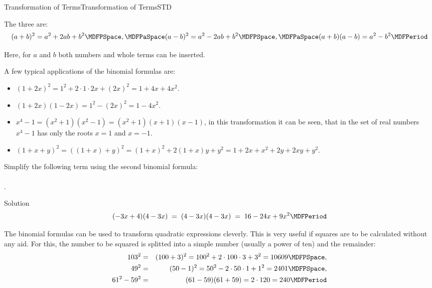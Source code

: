 \begin{MXContent}{Transformation of Terms}{Transformation of Terms}{STD}
\begin{MInfo}
The three  are:
$$ (a+b)^2 = a^2+2a b+b^2 \MDFPSpace, \MDFPaSpace (a-b)^2 = a^2-2a b+b^2 \MDFPSpace,\MDFPaSpace (a+b)(a-b) = a^2-b^2 \MDFPeriod $$
\end{MInfo}


Here, for $a$ and $b$ both numbers and whole terms can be inserted.

\begin{MExample}
A few typical applications of the binomial formulas are:
\begin{itemize}
\item{$(1+2x)^2=1^2+2\cdot1\cdot 2x+(2x)^2=1+4x+4x^2$.}
\item{$(1+2x)(1-2x)=1^2-(2x)^2=1-4x^2$.}
\item{$x^4-1=(x^2+1)(x^2-1)=(x^2+1)(x+1)(x-1)$, in this transformation it can be seen, that in the set 
of real numbers $x^4-1$ has only the roots $x=1$ and $x=-1$.}
\item{$(1+x+y)^2=\left({(1+x)+y}\right)^2= (1+x)^2+2(1+x)y+y^2=1+2x+x^2+2y+2x y+y^2$.}
\end{itemize}
\end{MExample}

\begin{MExercise}
Simplify the following term using the second binomial formula:\ \\ \ \\
.

\begin{MHint}{Solution}$$(-3x+4)(4-3x)\;=\; (4-3x)(4-3x)\;=\; 16-24x+9x^2 \MDFPeriod $$\end{MHint}
\end{MExercise}

\begin{MExample}%
The binomial formulas can be used to transform quadratic expressions cleverly.
This is very useful if squares are to be calculated without any aid. For this, the number to be 
squared is splitted into a simple number (usually a power of ten) and the remainder:
\begin{eqnarray*}
103^2 & = & (100+3)^2 = 100^2+2\cdot 100\cdot 3+3^2 = 10609 \MDFPSpace,\\
49^2 & = & (50-1)^2 = 50^2-2\cdot 50\cdot 1 +1^2 = 2401 \MDFPSpace,\\
61^2-59^2 & = & (61-59)(61+59) = 2\cdot 120 = 240 \MDFPeriod
\end{eqnarray*}
\end{MExample}


\end{MXContent}
